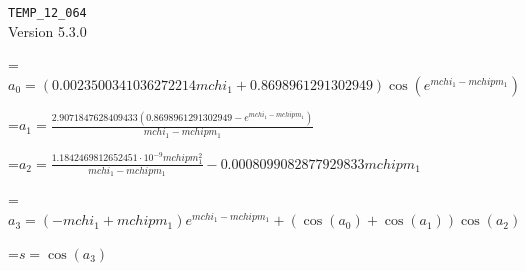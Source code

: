 \documentclass{article}
\newcommand{\exprline}[1]{\par\noindent\begingroup\setbox0=\hbox{$\displaystyle #1$}\ifdim\wd0>\linewidth\resizebox{\linewidth}{!}{\box0}\else\box0\fi\endgroup\par\medskip}
\begin{document}
\noindent\texttt{TEMP\_12\_064}\\
Version 5.3.0\\
\exprline{a_{0} = \left(0.0023500341036272214 mchi_{1} + 0.8698961291302949\right) \cos{\left(e^{mchi_{1} - mchipm_{1}} \right)}}
\exprline{a_{1} = \frac{2.9071847628409433 \left(0.8698961291302949 - e^{mchi_{1} - mchipm_{1}}\right)}{mchi_{1} - mchipm_{1}}}
\exprline{a_{2} = \frac{1.1842469812652451 \cdot 10^{-9} mchipm_{1}^{2}}{mchi_{1} - mchipm_{1}} - 0.0008099082877929833 mchipm_{1}}
\exprline{a_{3} = \left(- mchi_{1} + mchipm_{1}\right) e^{mchi_{1} - mchipm_{1}} + \left(\cos{\left(a_{0} \right)} + \cos{\left(a_{1} \right)}\right) \cos{\left(a_{2} \right)}}
\exprline{s = \cos{\left(a_{3} \right)}}
\end{document}
